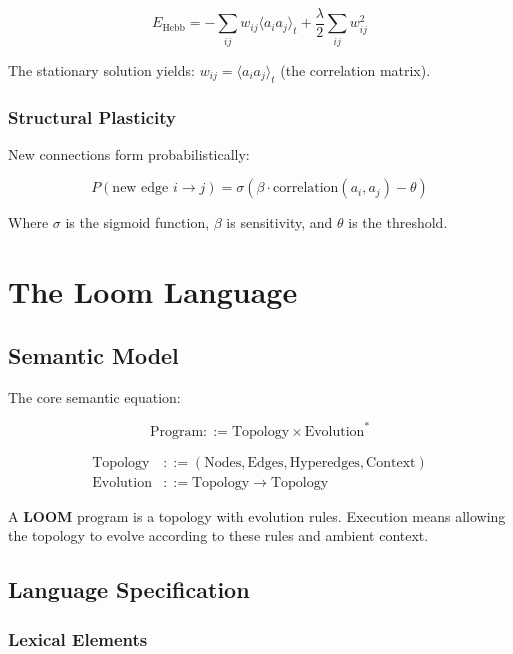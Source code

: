 \documentclass[12pt,a4paper,openany]{book} %
\newcommand{\loom}{\textbf{LOOM}}
\begin{document}
\begin{equation}
E_{\text{Hebb}} = -\sum_{ij} w_{ij}\langle a_i a_j \rangle_t + \frac{\lambda}{2}\sum_{ij} w_{ij}^2
\end{equation}

The stationary solution yields: $w_{ij} = \langle a_i a_j \rangle_t$ (the correlation matrix).

\subsection{Structural Plasticity}

New connections form probabilistically:

\begin{equation}
P(\text{new edge } i \to j) = \sigma(\beta \cdot \text{correlation}(a_i, a_j) - \theta)
\end{equation}

Where $\sigma$ is the sigmoid function, $\beta$ is sensitivity, and $\theta$ is the threshold.

\chapter{The Loom Language}

\section{Semantic Model}

The core semantic equation:

\begin{equation}
\text{Program} ::= \text{Topology} \times \text{Evolution}^*
\end{equation}

\begin{align}
\text{Topology} &::= (\text{Nodes}, \text{Edges}, \text{Hyperedges}, \text{Context})\\
\text{Evolution} &::= \text{Topology} \to \text{Topology}
\end{align}

A \loom{} program is a topology with evolution rules. Execution means allowing the topology to evolve according to these rules and ambient context.

\section{Language Specification}

\subsection{Lexical Elements}
\end{document}
